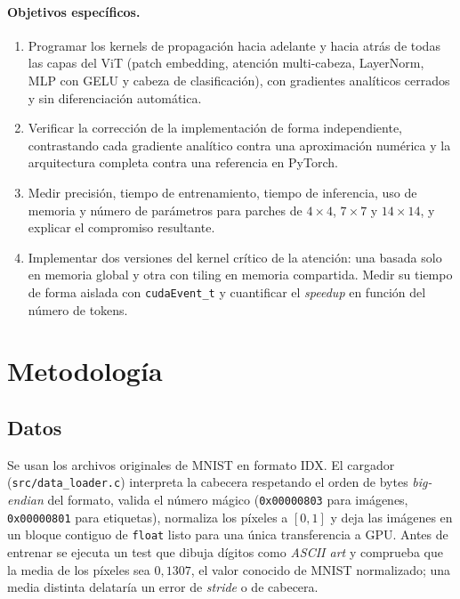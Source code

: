 \documentclass[11pt,a4paper]{article}
\begin{document}
\paragraph{Objetivos específicos.}
\begin{enumerate}\itemsep2pt
  \item Programar los kernels de propagación hacia adelante y hacia atrás de
        todas las capas del ViT (patch embedding, atención multi-cabeza,
        LayerNorm, MLP con GELU y cabeza de clasificación), con gradientes
        analíticos cerrados y sin diferenciación automática.
  \item Verificar la corrección de la implementación de forma independiente,
        contrastando cada gradiente analítico contra una aproximación numérica
        y la arquitectura completa contra una referencia en PyTorch.
  \item Medir precisión, tiempo de entrenamiento, tiempo de inferencia, uso de
        memoria y número de parámetros para parches de $4\times4$, $7\times7$ y
        $14\times14$, y explicar el compromiso resultante.
  \item Implementar dos versiones del kernel crítico de la atención: una
        basada solo en memoria global y otra con tiling en memoria compartida.
        Medir su tiempo de forma aislada con \texttt{cudaEvent\_t} y cuantificar
        el \emph{speedup} en función del número de tokens.
\end{enumerate}

\section{Metodología}

\subsection{Datos}

Se usan los archivos originales de MNIST en formato IDX. El cargador
(\texttt{src/data\_loader.c}) interpreta la cabecera respetando el orden de
bytes \emph{big-endian} del formato, valida el número mágico
(\texttt{0x00000803} para imágenes, \texttt{0x00000801} para etiquetas),
normaliza los píxeles a $[0,1]$ y deja las imágenes en un bloque contiguo de
\texttt{float} listo para una única transferencia a GPU. Antes de entrenar se
ejecuta un test que dibuja dígitos como \emph{ASCII art} y comprueba que la
media de los píxeles sea $0{,}1307$, el valor conocido de MNIST normalizado; una
media distinta delataría un error de \emph{stride} o de cabecera.
\end{document}
